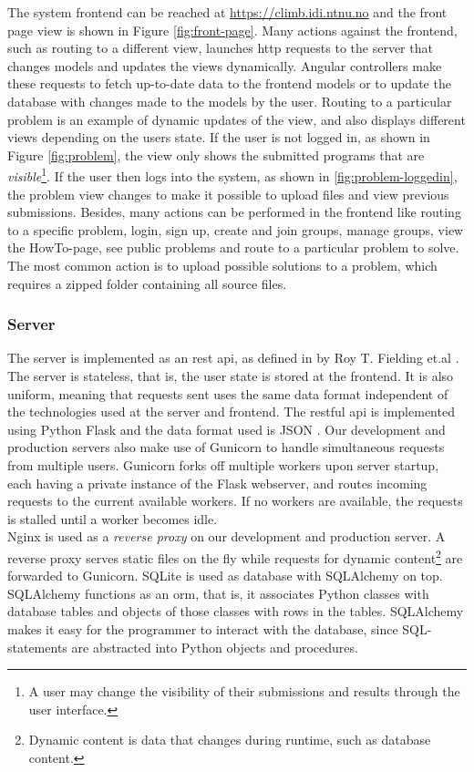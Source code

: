The system frontend can be reached at \url{https://climb.idi.ntnu.no} and the front page view is shown in Figure \ref{fig:front-page}. Many actions against the frontend, such as routing to a different view, launches \gls{http} requests to the server that changes models and updates the views dynamically. Angular controllers make these requests to fetch up-to-date data to the frontend models or to update the database with changes made to the models by the user. Routing to a particular problem is an example of dynamic updates of the view, and also displays different views depending on the users state. If the user is not logged in, as shown in Figure \ref{fig:problem}, the view only shows the submitted programs that are \textit{visible}\footnote{A user may change the visibility of their submissions and results through the user interface.}. If the user then logs into the system, as shown in \ref{fig:problem-loggedin}, the problem view changes to make it possible to upload files and view previous submissions. Besides, many actions can be performed in the frontend like routing to a specific problem, login, sign up, create and join groups, manage groups, view the HowTo-page, see public problems and route to a particular problem to solve. The most common action is to upload possible solutions to a problem, which requires a zipped folder containing all source files. \\

\subsubsection{Server} The server is implemented as an \gls{rest} \gls{api}, as defined in by Roy T. Fielding et.al \cite{a:rtf}. The server is stateless, that is, the user state is stored at the frontend. It is also uniform, meaning that requests sent uses the same data format independent of the technologies used at the server and frontend. The \gls{rest}ful \gls{api} is implemented using Python Flask \cite{FLASK} and the data format used is JSON \cite{JSON}. Our development and production servers also make use of Gunicorn \cite{GUNICORN} to handle simultaneous requests from multiple users. Gunicorn forks off multiple workers upon server startup, each having a private instance of the Flask webserver, and routes incoming requests to the current available workers. If no workers are available, the requests is stalled until a worker becomes idle. \\

Nginx \cite{NGINX} is used as a \textit{reverse proxy} on our development and production server. A reverse proxy serves static files on the fly while requests for dynamic content\footnote{Dynamic content is data that changes during runtime, such as database content.} are forwarded to Gunicorn. SQLite \cite{SQLITE} is used as database with SQLAlchemy \cite{SQLALCHEMY} on top. SQLAlchemy functions as an \gls{orm}, that is, it associates Python classes with database tables and objects of those classes with rows in the tables. SQLAlchemy makes it easy for the programmer to interact with the database, since SQL-statements are abstracted into Python objects and procedures. \\

